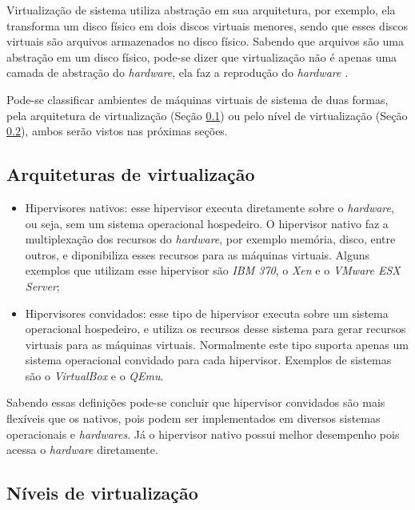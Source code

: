 Virtualização de sistema utiliza abstração em sua arquitetura, por exemplo, ela transforma um disco físico em dois discos 
virtuais menores, sendo que esses discos virtuais são arquivos armazenados no disco físico. Sabendo que arquivos são uma abstração
em um disco físico, pode-se dizer que virtualização não é apenas uma camada de abstração do \textit{hardware}, ela faz a reprodução 
do \textit{hardware} \cite{smithenair2005}.

Pode-se classificar ambientes de máquinas virtuais de sistema de duas formas, pela arquitetura de virtualização 
(Seção \ref{section:virtarq}) ou pelo nível de virtualização (Seção \ref{section:virtniv}), ambos serão vistos nas próximas seções.

\subsection{Arquiteturas de virtualização}
\label{section:virtarq}

\begin{itemize}
 \item Hipervisores nativos: esse hipervisor executa diretamente sobre o \textit{hardware}, ou seja, sem um sistema operacional
 hospedeiro. O hipervisor nativo faz a multiplexação dos recursos do \textit{hardware}, por exemplo memória, disco, entre outros,
 e diponibiliza esses recursos para as máquinas virtuais. Alguns exemplos que utilizam esse hipervisor são \textit{IBM 370}, 
 o \textit{Xen} e o \textit{VMware ESX Server};
 \item Hipervisores convidados: esse tipo de hipervisor executa sobre um sistema operacional hospedeiro, e utiliza os recursos 
 desse sistema para gerar recursos virtuais para as máquinas virtuais. Normalmente este tipo suporta apenas um sistema 
 operacional convidado para cada hipervisor. Exemplos de sistemas são o \textit{VirtualBox} e o \textit{QEmu}.
\end{itemize}

Sabendo essas definições pode-se concluir que hipervisor convidados são mais flexíveis que os nativos, pois podem ser implementados
em diversos sistemas operacionais e \textit{hardwares}. Já o hipervisor nativo possui melhor desempenho pois acessa o \textit{hardware}
diretamente.

\subsection{Níveis de virtualização}
\label{section:virtniv}

